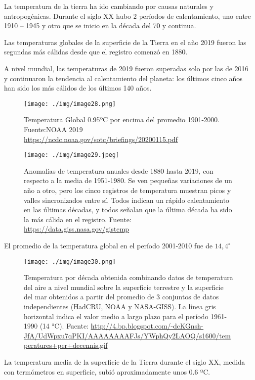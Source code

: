 \documentclass[
  a4paper,12pt]{extarticle}
\begin{document}
La temperatura de la tierra ha ido cambiando por causas naturales y
antropogénicas. Durante el siglo XX hubo 2 períodos de calentamiento,
uno entre 1910 -- 1945 y otro que se inicio en la década del 70 y
continua.

Las temperaturas globales de la superficie de la Tierra en el año 2019
fueron las segundas más cálidas desde que el registro comenzó en 1880.

A nivel mundial, las temperaturas de 2019 fueron superadas solo por las
de 2016 y continuaron la tendencia al calentamiento del planeta: los
últimos cinco años han sido los más cálidos de los últimos 140 años.

\begin{figure}
\centering
\texttt{[image: ./img/image28.png]}
\caption{Temperatura Global 0.95ºC por encima del promedio 1901-2000.
Fuente:NOAA 2019
\url{https://ncdc.noaa.gov/sotc/briefings/20200115.pdf}}
\end{figure}

\begin{figure}
\centering
\texttt{[image: ./img/image29.jpeg]}
\caption{Anomalías de temperatura anuales desde 1880 hasta 2019, con
respecto a la media de 1951-1980. Se ven pequeñas variaciones de un año
a otro, pero los cinco registros de temperatura muestran picos y valles
sincronizados entre sí. Todos indican un rápido calentamiento en las
últimas décadas, y todos señalan que la última década ha sido la más
cálida en el registro. Fuente: \url{https://data.giss.nasa.gov/gistemp}}
\end{figure}

El promedio de la temperatura global en el período 2001-2010 fue de
\(14,4^\circ\)

\begin{figure}
\centering
\texttt{[image: ./img/image30.png]}
\caption{Temperatura por década obtenida combinando datos de temperatura
del aire a nivel mundial sobre la superficie terrestre y la superficie
del mar obtenidos a partir del promedio de 3 conjuntos de datos
independientes (HadCRU, NOAA y NASA-GISS). La línea gris horizontal
indica el valor medio a largo plazo para el período 1961-1990 (14 °C).
Fuente:
\url{http://4.bp.blogspot.com/-dcKGnsh-JfA/UdWpxu7qPKI/AAAAAAAAFJs/YWphQy2LAOQ/s1600/temperatures+per+decennis.gif}}
\end{figure}

La temperatura media de la superficie de la Tierra durante el siglo XX,
medida con termómetros en superficie, subió aproximadamente unos 0.6 ºC.
\end{document}
